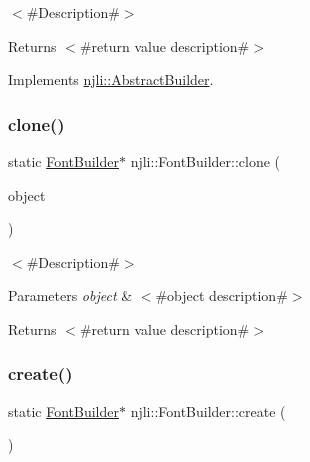 $<$\#\+Description\#$>$

\begin{DoxyReturn}{Returns}
$<$\#return value description\#$>$ 
\end{DoxyReturn}


Implements \mbox{\hyperlink{classnjli_1_1_abstract_builder_aa1d220053e182c37b31b427499c6eacf}{njli\+::\+Abstract\+Builder}}.

\mbox{\label{classnjli_1_1_font_builder_ad940d5ca2cbfbe14e9e5bf562e518572}} 
\subsubsection{\texorpdfstring{clone()}{clone()}}
{\footnotesize\ttfamily static \mbox{\hyperlink{classnjli_1_1_font_builder}{Font\+Builder}}$\ast$ njli\+::\+Font\+Builder\+::clone (\begin{DoxyParamCaption}\item[{const \mbox{\hyperlink{classnjli_1_1_font_builder}{Font\+Builder}} \&}]{object }\end{DoxyParamCaption})\hspace{0.3cm}{\ttfamily [static]}}

$<$\#\+Description\#$>$


\begin{DoxyParams}{Parameters}
{\em object} & $<$\#object description\#$>$\\
\hline
\end{DoxyParams}
\begin{DoxyReturn}{Returns}
$<$\#return value description\#$>$ 
\end{DoxyReturn}
\mbox{\label{classnjli_1_1_font_builder_a2a4979dda753397f53fe8bc470f270bf}} 
\subsubsection{\texorpdfstring{create()}{create()}}
{\footnotesize\ttfamily static \mbox{\hyperlink{classnjli_1_1_font_builder}{Font\+Builder}}$\ast$ njli\+::\+Font\+Builder\+::create (\begin{DoxyParamCaption}{ }\end{DoxyParamCaption})\hspace{0.3cm}{\ttfamily [static]}}

